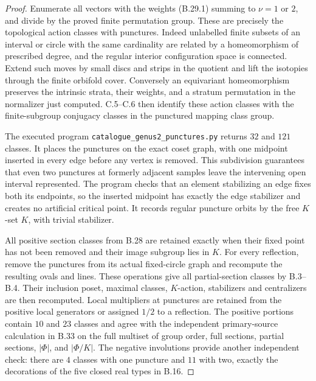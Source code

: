 \begin{proof}
Enumerate all vectors with the weights (B.29.1) summing to
$\nu=1$ or $2$, and divide by the proved finite permutation group.
These are precisely the topological action classes with punctures.
Indeed unlabelled finite subsets of an interval or circle with
the same cardinality are related by a homeomorphism of prescribed
degree, and the regular interior configuration space is connected.
Extend such moves by small discs and strips in the quotient and
lift the isotopies through the finite orbifold cover.  Conversely
an equivariant homeomorphism preserves the intrinsic strata,
their weights, and a stratum permutation in the normalizer just
computed.  C.5--C.6 then identify these action classes with the
finite-subgroup conjugacy classes in the punctured mapping class
group.

The executed program \texttt{catalogue\_genus2\_punctures.py}
returns $32$ and $121$ classes.  It places the punctures on the
exact coset graph, with one midpoint inserted in every edge before
any vertex is removed.  This subdivision guarantees that even
two punctures at formerly adjacent samples leave the intervening
open interval represented.  The program checks that an element
stabilizing an edge fixes both its endpoints, so the inserted
midpoint has exactly the edge stabilizer and creates no artificial
critical point.  It records regular puncture orbits by the free
$K$-set $K$, with trivial stabilizer.

All positive section classes from B.28 are retained exactly when
their fixed point has not been removed and their image subgroup
lies in $K$.  For every reflection, remove the punctures from its
actual fixed-circle graph and recompute the resulting ovals and
lines.  These operations give all partial-section classes by
B.3--B.4.  Their inclusion poset, maximal classes, $K$-action,
stabilizers and centralizers are then recomputed.
Local multipliers at punctures are retained from the positive
local generators or assigned $1/2$ to a reflection.
The positive portions contain $10$ and $23$ classes and agree
with the independent primary-source calculation in B.33 on the
full multiset of group order, full sections, partial sections,
$|\Phi|$, and $|\Phi/K|$.  The negative involutions provide
another independent check: there are $4$ classes with one
puncture and $11$ with two, exactly the decorations of the five
closed real types in B.16.
\end{proof}
